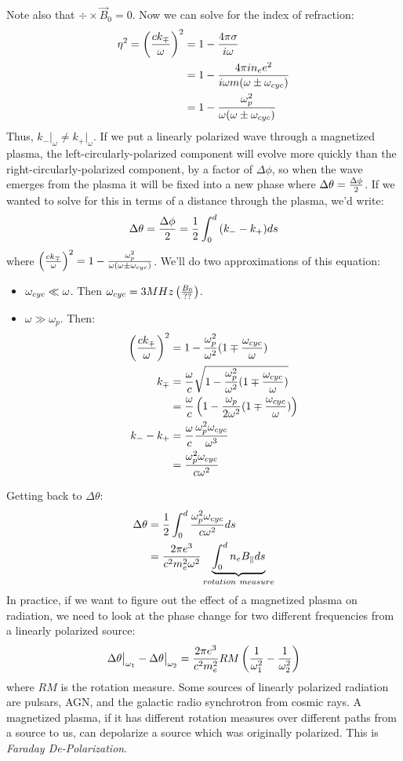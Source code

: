 \documentclass[11pt]{article}
\def\hf{{1 \over 2}}
\def\inv#1{{1 \over #1}}
\def\eval#1{\big|_{#1}}
\def\bfield{{\vec B}}
\begin{document}
Note also that $\div\times\bfield_0=0$.  Now we can solve for the index of
refraction:
$$\begin{aligned}\eta^2=\left({ck_\mp\over\omega}\right)^2
&=1-{4\pi\sigma\over i\omega}\\ 
&=1-{4\pi in_ee^2\over i\omega m(\omega\pm\omega_{cyc})}\\ 
&=1-{\omega_p^2\over\omega(\omega\pm\omega_{cyc})}\\ \end{aligned}$$
Thus, $k_-\eval{\omega}\ne k_+\eval{\omega}$.  If we put a linearly polarized
wave through a magnetized plasma, the left-circularly-polarized component will
evolve more quickly than the right-circularly-polarized component, by a
factor of $\Delta\phi$, so when the wave emerges from the plasma it will be
fixed into a new phase where $\Delta\theta={\Delta\phi\over2}$.  If we wanted
to solve for this in terms of a distance through the plasma, we'd write:
$$\Delta\theta={\Delta\phi\over2}=\hf\int_0^d{(k_--k_+)ds}$$
where $\left({ck_\mp\over\omega}\right)^2=1-{\omega_p^2\over\omega(\omega\pm
\omega_{cyc})}$.  We'll do two approximations of this equation:
\begin{itemize}
\item $\omega_{cyc}\ll\omega$.  Then $\omega_{cyc}=3MHz\left({B_0\over ??}\right)$.
\item $\omega\gg\omega_p$.  Then:
$$\begin{aligned}\left({ck_\mp\over\omega}\right)^2
&=1-{\omega_p^2\over\omega^2}(1\mp{\omega_{cyc}\over\omega})\\ 
k_\mp&={\omega\over c}
\sqrt{1-{\omega_p^2\over\omega^2}(1\mp{\omega_{cyc}\over\omega})}\\ 
&={\omega\over c}
\left(1-{\omega_p\over2\omega^2}(1\mp{\omega_{cyc}\over\omega})\right)\\ 
k_--k_+&={\omega\over c}{\omega_p^2\omega_{cyc}\over\omega^3}\\ 
&={\omega_p^2\omega_{cyc}\over c\omega^2}\\ \end{aligned}$$
\end{itemize}
Getting back to $\Delta\theta$:
$$\begin{aligned}\Delta\theta&=\hf\int_0^d{{\omega_p^2\ocyc\over c\omega^2}ds}\\ 
&={2\pi e^3\over c^2m_e^2\omega^2}\underbrace{\int_0^d{n_eB_\|ds}}_{rotation\ 
measure}\\ \end{aligned}$$
In practice, if we want to figure out the effect of a magnetized plasma on
radiation, we need to look at the phase change for two different frequencies 
from a linearly polarized source:
$$\Delta\theta\eval{\omega_1}-\Delta\theta\eval{\omega_2}
={2\pi e^3\over c^2m_e^2}RM\left(\inv{\omega_1^2}-\inv{\omega_2^2}\right)$$
where $RM$ is the rotation measure.
Some sources of linearly polarized radiation are pulsars, AGN, and the
galactic radio synchrotron from cosmic rays.  A magnetized plasma, if it
has different rotation measures over different paths from a source to us, can
depolarize a source which was originally polarized.  This is {\it Faraday
De-Polarization}.
\end{document}
